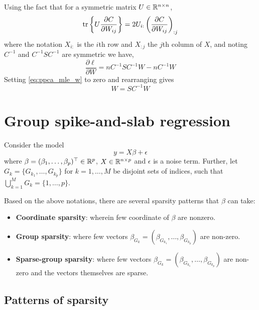 \documentclass[12pt]{article}
\begin{document}
Using the fact that for a symmetric matrix $U \in \mathbb{R}^{n \times n}$,
\begin{equation}
    \operatorname{tr} \left\{ U \frac{\partial C}{\partial W_{ij}} \right\} 
    = 2 U_{i:} \left( \frac{\partial C}{\partial W_{ij}} \right)_{:j}
\end{equation}
where the notation $X_{i:}$ is the $i$th row and $X_{:j}$ the $j$th column of $X$,
and noting $C^{-1}$ and $C^{-1}SC^{-1}$ are symmetric we have,
\begin{equation}\label{eq:ppca_mle_w}
    \frac{\partial \ell}{\partial W} = nC^{-1}SC^{-1} W - nC^{-1} W 
\end{equation}
Setting \eqref{eq:ppca_mle_w} to zero and rearranging gives
\begin{equation}
W = SC^{-1}W
\end{equation}


\newpage
\section{Group spike-and-slab regression}

Consider the model
\begin{equation}
    y = X\beta + \epsilon
\end{equation}
where $\beta = (\beta_1, \dots, \beta_p)^\top \in \mathbb{R}^p$, $X \in \mathbb{R}^{n \times p}$ and $\epsilon$ is a noise term. Further, let $G_k = \{ G_{k_1}, \dots, G_{k_p} \}$ for $k=1,\dots,M$ be disjoint sets of indices, such that $ \bigcup_{k=1}^M G_k = \{1, \dots, p \}$.

Based on the above notations, there are several sparsity patterns that $\beta$ can take:
\begin{itemize}
    \itemsep1pt
    \item \textbf{Coordinate sparsity}: wherein few coordinate of $\beta$ are nonzero.
    \item \textbf{Group sparsity}: where few vectors $\beta_{G_k} = (\beta_{G_{k_1}}, \dots, \beta_{G_{k_p}})$ are non-zero.
    \item \textbf{Sparse-group sparsity}: where few vectors $\beta_{G_k} = (\beta_{G_{k_1}}, \dots, \beta_{G_{k_p}})$ are non-zero and the vectors themselves are sparse.
\end{itemize}




\subsection{Patterns of sparsity}
\end{document}
